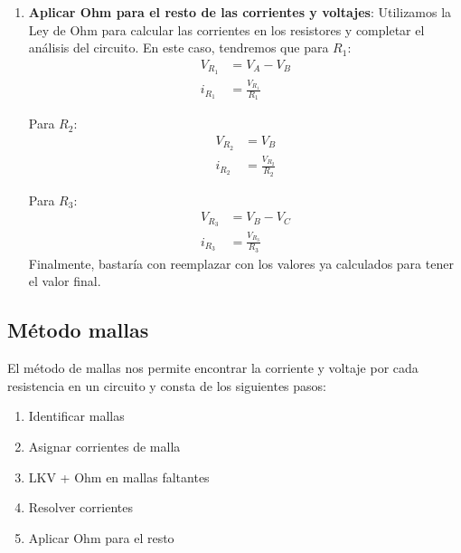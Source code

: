 \begin{example}
\begin{enumerate}
    \item \textbf{Aplicar Ohm para el resto de las corrientes y voltajes}: Utilizamos la Ley de Ohm para calcular las corrientes en los resistores y completar el análisis del circuito.
    En este caso, tendremos que para $R_1$:
    \begin{align*}
        V_{R_1}&=V_A-V_B\\
        i_{R_1}&=\frac{V_{R_1}}{R_1}
    \end{align*}

    Para $R_2$:
    \begin{align*}
        V_{R_2}&=V_B\\
        i_{R_2}&=\frac{V_{R_2}}{R_2}
    \end{align*}
    
    Para $R_3$:
    \begin{align*}
        V_{R_3}&=V_B-V_C\\
        i_{R_3}&=\frac{V_{R_3}}{R_3}
    \end{align*}
    Finalmente, bastaría con reemplazar con los valores ya calculados para tener el valor final.
\end{enumerate}



\end{example}

\subsection{Método mallas}
El método de mallas nos permite encontrar la corriente y voltaje por cada resistencia en un circuito y consta de los siguientes pasos:
\begin{enumerate}
    \item Identificar mallas
    \item Asignar corrientes de malla
    \item LKV + Ohm en mallas faltantes
    \item Resolver corrientes
	\item Aplicar Ohm para el resto
\end{enumerate}

